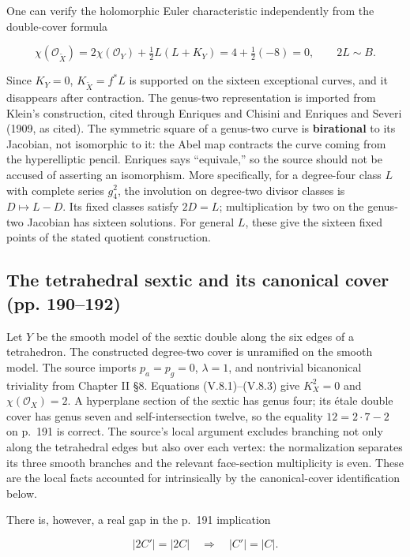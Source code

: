 One can verify the holomorphic Euler characteristic independently from the double-cover formula

\[
\chi(\mathcal O_{\widetilde X})
=2\chi(\mathcal O_Y)+\tfrac12 L(L+K_Y)
=4+\tfrac12(-8)=0,\qquad 2L\sim B.
\]

Since \(K_Y=0\), \(K_{\widetilde X}=f^*L\) is supported on the sixteen exceptional curves, and it disappears after contraction. The genus-two representation is imported from Klein's construction, cited through Enriques and Chisini and Enriques and Severi (1909, as cited). The symmetric square of a genus-two curve is \textbf{birational} to its Jacobian, not isomorphic to it: the Abel map contracts the curve coming from the hyperelliptic pencil. Enriques says ``equivale,'' so the source should not be accused of asserting an isomorphism. More specifically, for a degree-four class \(L\) with complete series \(g^2_4\), the involution on degree-two divisor classes is \(D\mapsto L-D\). Its fixed classes satisfy \(2D=L\); multiplication by two on the genus-two Jacobian has sixteen solutions. For general \(L\), these give the sixteen fixed points of the stated quotient construction.

\subsection{The tetrahedral sextic and its canonical cover (pp. 190--192)}

Let \(Y\) be the smooth model of the sextic double along the six edges of a tetrahedron. The constructed degree-two cover is unramified on the smooth model. The source imports \(p_a=p_g=0\), \(\lambda=1\), and nontrivial bicanonical triviality from Chapter II §8. Equations (V.8.1)--(V.8.3) give \(K_X^2=0\) and \(\chi(\mathcal O_X)=2\). A hyperplane section of the sextic has genus four; its étale double cover has genus seven and self-intersection twelve, so the equality \(12=2\cdot7-2\) on p.~191 is correct. The source's local argument excludes branching not only along the tetrahedral edges but also over each vertex: the normalization separates its three smooth branches and the relevant face-section multiplicity is even. These are the local facts accounted for intrinsically by the canonical-cover identification below.

There is, however, a real gap in the p.~191 implication

\[
|2C'|=|2C|\quad\Longrightarrow\quad |C'|=|C|.
\]

